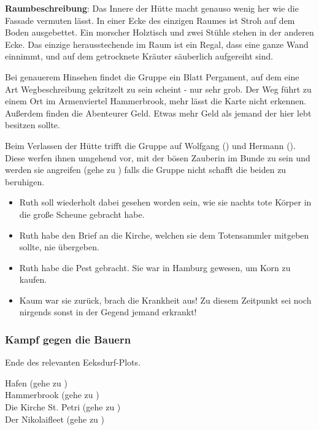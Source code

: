 \textbf{Raumbeschreibung}: Das Innere der Hütte macht genauso wenig her wie die Fassade vermuten lässt. In einer Ecke des einzigen Raumes ist Stroh auf dem Boden ausgebettet. Ein morscher Holztisch und zwei Stühle stehen in der anderen Ecke. Das einzige herausstechende im Raum ist ein Regal, dass eine ganze Wand einnimmt, und auf dem getrocknete Kräuter säuberlich aufgereiht sind.

Bei genauerem Hinsehen findet die Gruppe ein Blatt Pergament, auf dem eine Art Wegbeschreibung gekritzelt zu sein scheint - nur sehr grob. Der Weg führt zu einem Ort im Armenviertel Hammerbrook, mehr lässt die Karte nicht erkennen. Außerdem finden die Abenteurer Geld. Etwas mehr Geld als jemand der hier lebt besitzen sollte.

Beim Verlassen der Hütte trifft die Gruppe auf Wolfgang (\blue{\ref{Wolfgang}}) und Hermann (\blue{\ref{Hermann}}). Diese werfen ihnen umgehend vor, mit der bösen Zauberin im Bunde zu sein und werden sie angreifen (gehe zu \blue{\ref{kampf}}) falls die Gruppe nicht schafft die beiden zu beruhigen.


\begin{itemize}
  \item Ruth soll wiederholt dabei gesehen worden sein, wie sie nachts tote Körper in die große Scheune gebracht habe.
  \item Ruth habe den Brief an die Kirche, welchen sie dem Totensammler mitgeben sollte, nie übergeben.
  \item Ruth habe die Pest gebracht. Sie war in Hamburg gewesen, um Korn zu kaufen.
  \item Kaum war sie zurück, brach die Krankheit aus! Zu diesem Zeitpunkt sei noch nirgends sonst in der Gegend jemand erkrankt!
\end{itemize}

\subsubsection{Kampf gegen die Bauern}
\label{kampf}

\begin{center}
  
\end{center}




Ende des relevanten Eeksdurf-Plots.

Hafen (gehe zu \blue{\ref{Hafen}}) \\
Hammerbrook (gehe zu \blue{\ref{arm}}) \\
Die Kirche St. Petri (gehe zu \blue{\ref{Petri}}) \\
Der Nikolaifleet (gehe zu \blue{\ref{Fleet}}) \\
